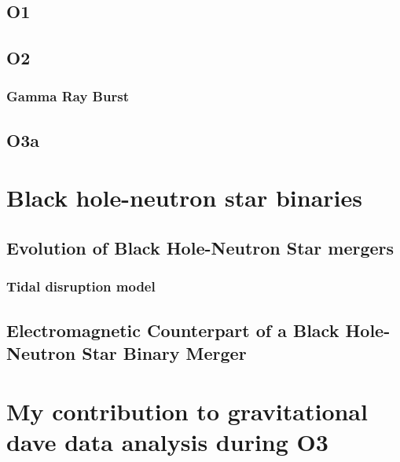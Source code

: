 \documentclass[binding=0.6cm, LaM]{sapthesis}
\begin{document}
\section{O1}

\section{O2}

\subsection{Gamma Ray Burst}

\section{O3a}
\chapter{Black hole-neutron star binaries}



\section{Evolution of Black Hole-Neutron Star mergers}



\subsection{Tidal disruption model}




\section{Electromagnetic Counterpart of a Black Hole-Neutron Star Binary Merger}


\chapter{My contribution to gravitational dave data analysis during O3}
\end{document}
